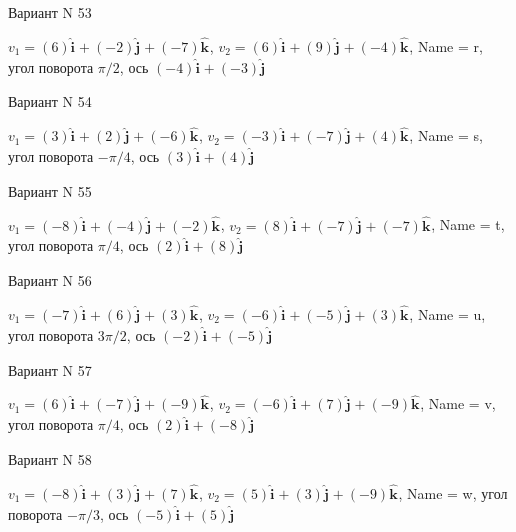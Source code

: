 \documentclass[11pt]{report}
\begin{document}
Вариант N 53

$v_1 = \left(6\right)\mathbf{\hat{i}_{}} + \left(-2\right)\mathbf{\hat{j}_{}} + \left(-7\right)\mathbf{\hat{k}_{}}$, $v_2 = \left(6\right)\mathbf{\hat{i}_{}} + \left(9\right)\mathbf{\hat{j}_{}} + \left(-4\right)\mathbf{\hat{k}_{}}$, Name = r, угол поворота $\pi / 2$, ось $\left(-4\right)\mathbf{\hat{i}_{}} + \left(-3\right)\mathbf{\hat{j}_{}}$

Вариант N 54

$v_1 = \left(3\right)\mathbf{\hat{i}_{}} + \left(2\right)\mathbf{\hat{j}_{}} + \left(-6\right)\mathbf{\hat{k}_{}}$, $v_2 = \left(-3\right)\mathbf{\hat{i}_{}} + \left(-7\right)\mathbf{\hat{j}_{}} + \left(4\right)\mathbf{\hat{k}_{}}$, Name = s, угол поворота $- \pi / 4$, ось $\left(3\right)\mathbf{\hat{i}_{}} + \left(4\right)\mathbf{\hat{j}_{}}$

Вариант N 55

$v_1 = \left(-8\right)\mathbf{\hat{i}_{}} + \left(-4\right)\mathbf{\hat{j}_{}} + \left(-2\right)\mathbf{\hat{k}_{}}$, $v_2 = \left(8\right)\mathbf{\hat{i}_{}} + \left(-7\right)\mathbf{\hat{j}_{}} + \left(-7\right)\mathbf{\hat{k}_{}}$, Name = t, угол поворота $\pi / 4$, ось $\left(2\right)\mathbf{\hat{i}_{}} + \left(8\right)\mathbf{\hat{j}_{}}$

Вариант N 56

$v_1 = \left(-7\right)\mathbf{\hat{i}_{}} + \left(6\right)\mathbf{\hat{j}_{}} + \left(3\right)\mathbf{\hat{k}_{}}$, $v_2 = \left(-6\right)\mathbf{\hat{i}_{}} + \left(-5\right)\mathbf{\hat{j}_{}} + \left(3\right)\mathbf{\hat{k}_{}}$, Name = u, угол поворота $3 \pi / 2$, ось $\left(-2\right)\mathbf{\hat{i}_{}} + \left(-5\right)\mathbf{\hat{j}_{}}$

Вариант N 57

$v_1 = \left(6\right)\mathbf{\hat{i}_{}} + \left(-7\right)\mathbf{\hat{j}_{}} + \left(-9\right)\mathbf{\hat{k}_{}}$, $v_2 = \left(-6\right)\mathbf{\hat{i}_{}} + \left(7\right)\mathbf{\hat{j}_{}} + \left(-9\right)\mathbf{\hat{k}_{}}$, Name = v, угол поворота $\pi / 4$, ось $\left(2\right)\mathbf{\hat{i}_{}} + \left(-8\right)\mathbf{\hat{j}_{}}$

Вариант N 58

$v_1 = \left(-8\right)\mathbf{\hat{i}_{}} + \left(3\right)\mathbf{\hat{j}_{}} + \left(7\right)\mathbf{\hat{k}_{}}$, $v_2 = \left(5\right)\mathbf{\hat{i}_{}} + \left(3\right)\mathbf{\hat{j}_{}} + \left(-9\right)\mathbf{\hat{k}_{}}$, Name = w, угол поворота $- \pi / 3$, ось $\left(-5\right)\mathbf{\hat{i}_{}} + \left(5\right)\mathbf{\hat{j}_{}}$
\end{document}
